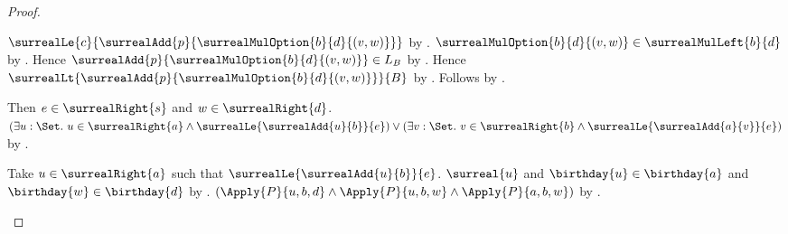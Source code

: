 \begin{proof}
\begin{subproof}
\begin{subproof}
\begin{byCase}
\begin{byCase}
                            $\surrealLe{c}
                                {\surrealAdd{p}
                                    {\surrealMulOption{b}{d}{(v,w)}}}$
                                by
                                .
                            $\surrealMulOption{b}{d}{(v,w)}
                                \in\surrealMulLeft{b}{d}$
                                by .
                            Hence $\surrealAdd{p}
                                {\surrealMulOption{b}{d}{(v,w)}}
                                \in L_B$
                                by .
                            Hence $\surrealLt
                                {\surrealAdd{p}
                                    {\surrealMulOption{b}{d}{(v,w)}}}
                                {B}$
                                by .
                            Follows by
                                .
                    \end{byCase}
                    Then $e\in\surrealRight{s}$ and
                        $w\in\surrealRight{d}$.
                    $(\exists u:\Set.\ u\in\surrealRight{a}\land
                            \surrealLe{\surrealAdd{u}{b}}{e})
                        \lor
                        (\exists v:\Set.\ v\in\surrealRight{b}\land
                            \surrealLe{\surrealAdd{a}{v}}{e})$
                        by .
                    \begin{byCase}
                            Take $u\in\surrealRight{a}$ such that
                                $\surrealLe{\surrealAdd{u}{b}}{e}$.
                            $\surreal{u}$ and
                                $\birthday{u}\in\birthday{a}$ and
                                $\birthday{w}\in\birthday{d}$
                                by .
                            $(\Apply{P}{u,b,d}
                              \land\Apply{P}{u,b,w}
                              \land\Apply{P}{a,b,w})$
                                by \auto.

\end{byCase}
\end{byCase}
\end{subproof}
\end{subproof}
\end{proof}
